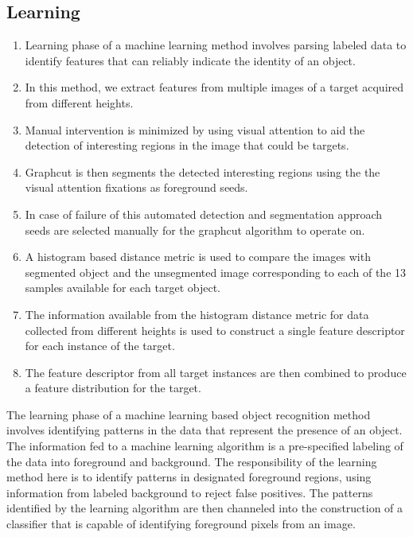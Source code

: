\documentclass {udthesis}
\begin{document}
\subsection{Learning}

\begin{enumerate}
	\item Learning phase of a machine learning method involves parsing labeled data to identify features that can reliably indicate the identity of an object.
	
	\item In this method, we extract features from multiple images of a target acquired from different heights.
	
	\item Manual intervention is minimized by using visual attention to aid the detection of interesting regions in the image that could be targets.
	
	\item Graphcut is then segments the detected interesting regions using the the visual attention fixations as foreground seeds.
	
	\item In case of failure of this automated detection and segmentation approach seeds are selected manually for the graphcut algorithm to operate on.
	
	\item A histogram based distance metric is used to compare the images with segmented object and the unsegmented image corresponding to each of the 13 samples available for each target object.
	
	\item The information available from the histogram distance metric for data collected from different heights is used to construct a single feature descriptor for each instance of the target.
	
	\item The feature descriptor from all target instances are then combined to produce a feature distribution for the target.
\end{enumerate}


The learning phase of a machine learning based object recognition method involves identifying patterns in the data that represent the presence of an object. The information fed to a machine learning algorithm is a pre-specified labeling of the data into foreground and background. The responsibility of the learning method here is to identify patterns in designated foreground regions, using information from labeled background to reject false positives. The patterns identified by the learning algorithm are then channeled into the construction of a classifier that is capable of identifying foreground pixels from an image.
\end{document}
